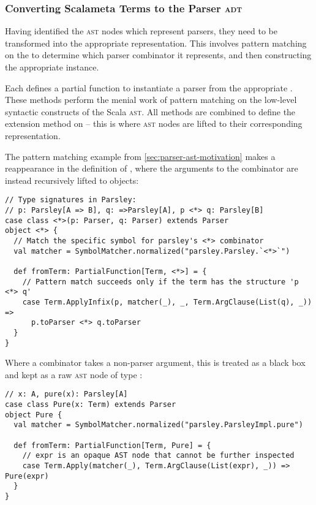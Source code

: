 \documentclass[../../main.tex]{subfiles}
\begin{document}

\subsubsection{Converting Scalameta Terms to the Parser \textsc{adt}}
Having identified the \textsc{ast} nodes which represent parsers, they need to be transformed into the appropriate  representation.
This involves pattern matching on the  to determine which parser combinator it represents, and then constructing the appropriate  instance.

Each  defines a partial function  to instantiate a parser from the appropriate .
These  methods perform the menial work of pattern matching on the low-level syntactic constructs of the Scala \textsc{ast}.
All  methods are combined to define the  extension method on  -- this is where \textsc{ast} nodes are lifted to their corresponding  representation.

The pattern matching example from \cref{sec:parser-ast-motivation} makes a reappearance in the definition of , where the arguments to the \scala{<*>} combinator are instead recursively lifted to  objects:
\begin{verbatim}
// Type signatures in Parsley:
// p: Parsley[A => B], q: =>Parsley[A], p <*> q: Parsley[B]
case class <*>(p: Parser, q: Parser) extends Parser
object <*> {
  // Match the specific symbol for parsley's <*> combinator
  val matcher = SymbolMatcher.normalized("parsley.Parsley.`<*>`")

  def fromTerm: PartialFunction[Term, <*>] = {
    // Pattern match succeeds only if the term has the structure 'p <*> q'
    case Term.ApplyInfix(p, matcher(_), _, Term.ArgClause(List(q), _)) =>
      p.toParser <*> q.toParser
  }
}
\end{verbatim}
%
Where a combinator takes a non-parser argument, this is treated as a black box and kept as a raw \textsc{ast} node of type :
\begin{verbatim}
// x: A, pure(x): Parsley[A]
case class Pure(x: Term) extends Parser
object Pure {
  val matcher = SymbolMatcher.normalized("parsley.ParsleyImpl.pure")

  def fromTerm: PartialFunction[Term, Pure] = {
    // expr is an opaque AST node that cannot be further inspected
    case Term.Apply(matcher(_), Term.ArgClause(List(expr), _)) => Pure(expr)
  }
}
\end{verbatim}
\end{document}
